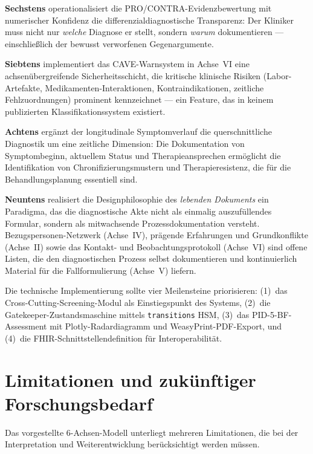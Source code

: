 \documentclass[11pt,a4paper]{article}
\begin{document}
\textbf{Sechstens} operationalisiert die PRO/CONTRA-Evidenzbewertung mit numerischer Konfidenz die differenzialdiagnostische Transparenz: Der Kliniker muss nicht nur \textit{welche} Diagnose er stellt, sondern \textit{warum} dokumentieren --- einschlie\ss{}lich der bewusst verworfenen Gegenargumente.

\textbf{Siebtens} implementiert das CAVE-Warnsystem in Achse~VI eine achsen\"ubergreifende Sicherheitsschicht, die kritische klinische Risiken (Labor-Artefakte, Medikamenten-Interaktionen, Kontraindikationen, zeitliche Fehlzuordnungen) prominent kennzeichnet --- ein Feature, das in keinem publizierten Klassifikationssystem existiert.

\textbf{Achtens} erg\"anzt der longitudinale Symptomverlauf die querschnittliche Diagnostik um eine zeitliche Dimension: Die Dokumentation von Symptombeginn, aktuellem Status und Therapieansprechen erm\"oglicht die Identifikation von Chronifizierungsmustern und Therapieresistenz, die f\"ur die Behandlungsplanung essentiell sind.

\textbf{Neuntens} realisiert die Designphilosophie des \textit{lebenden Dokuments} ein Paradigma, das die diagnostische Akte nicht als einmalig auszuf\"ullendes Formular, sondern als mitwachsende Prozessdokumentation versteht. Bezugspersonen-Netzwerk (Achse~IV), pr\"agende Erfahrungen und Grundkonflikte (Achse~II) sowie das Kontakt- und Beobachtungsprotokoll (Achse~VI) sind offene Listen, die den diagnostischen Prozess selbst dokumentieren und kontinuierlich Material f\"ur die Fallformulierung (Achse~V) liefern.

Die technische Implementierung sollte vier Meilensteine priorisieren: (1)~das Cross-Cutting-Screening-Modul als Einstiegspunkt des Systems, (2)~die Gatekeeper-Zustandsmaschine mittels \texttt{transitions} HSM, (3)~das PID-5-BF-Assessment mit Plotly-Radardiagramm und WeasyPrint-PDF-Export, und (4)~die FHIR-Schnittstellendefinition f\"ur Interoperabilit\"at.


\section{Limitationen und zuk\"unftiger Forschungsbedarf}
\label{sec:limitationen}

Das vorgestellte 6-Achsen-Modell unterliegt mehreren Limitationen, die bei der Interpretation und Weiterentwicklung ber\"ucksichtigt werden m\"ussen.
\end{document}
